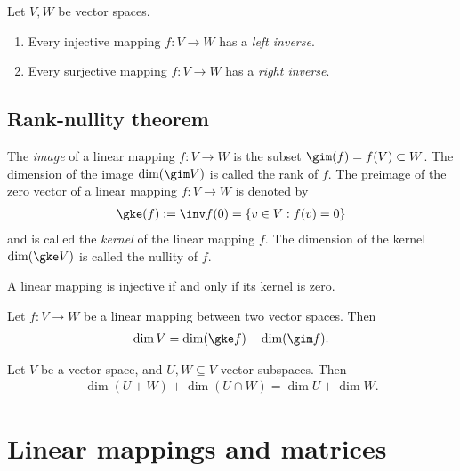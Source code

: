 \documentclass{article}
\begin{document}
\begin{proposition}[Notes 1.7.9]
    Let $V,W$ be vector spaces.
    \begin{enumerate}
        \item Every injective mapping $f:V\to W$ has a \emph{left inverse}.
        \item Every surjective mapping $f:V\to W$ has a \emph{right inverse}.
    \end{enumerate}
\end{proposition}

\subsection{Rank-nullity theorem}

\begin{definition}
    The \emph{image} of a linear mapping $f:V\to W$ is the subset $\gim(f)=f(V)\subset W$.
    The dimension of the image $\dim(\gim V)$ is called the rank of $f$.
    The preimage of the zero vector of a linear mapping $f:V\to W$ is denoted by
    \begin{align*}
        \gke(f):=\inv f(0)=\{v\in V : f(v)=0\}
    \end{align*}
    and is called the \emph{kernel} of the linear mapping $f$. The dimension of the
    kernel $\dim(\gke V)$ is called the nullity of $f$.
\end{definition}

\begin{lemma}[Notes 1.8.2]
    A linear mapping is injective if and only if its kernel is zero.
\end{lemma}

\begin{theorem}
    Let $f:V\to W$ be a linear mapping between two vector spaces. Then
    \begin{align*}
        \dim V = \dim(\gke f) + \dim(\gim f).
    \end{align*}
\end{theorem}

\begin{corollary}
    Let $V$ be a vector space, and $U,W\subseteq V$ vector subspaces. Then
    \begin{align*}
        \dim(U+W)+\dim(U\cap W) = \dim U + \dim W.
    \end{align*}
\end{corollary}

\section{Linear mappings and matrices}
\end{document}
